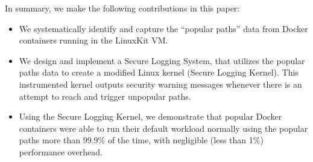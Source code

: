 In summary, we make the following contributions in this paper: 
\begin{itemize}
	\item We systematically identify and capture the ``popular paths'' data from Docker containers running in the LinuxKit VM. 
	\item We design and implement a Secure Logging System, that utilizes the popular paths data to create a modified Linux kernel (Secure Logging Kernel). This instrumented kernel outputs security warning messages whenever there is an attempt to reach and trigger unpopular paths. 
	\item Using the Secure Logging Kernel, we demonstrate that popular Docker containers were able to run their default workload normally using the popular paths more than 99.9\% of the time, with negligible (less than 1\%) performance overhead.
\end{itemize}